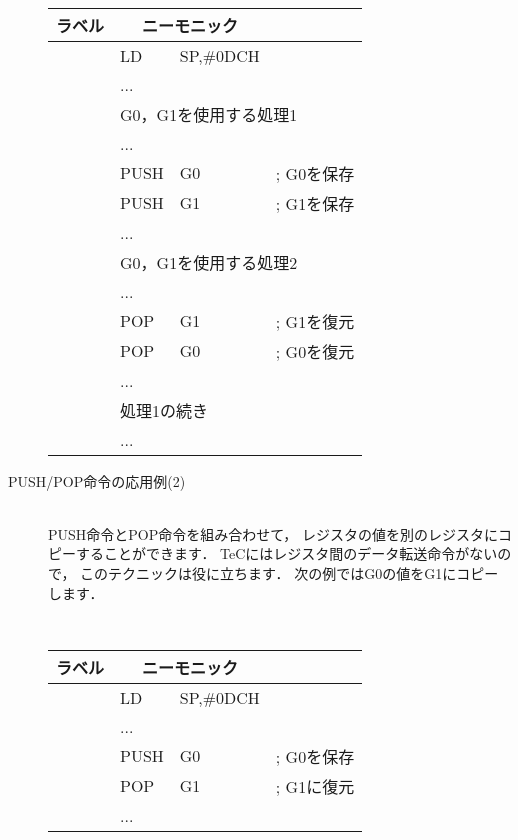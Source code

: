\begin{description}
\begin{center}
{\small\tt
\begin{tabular}{|l|l l l|}
\hline
ラベル & \multicolumn{2}{|c}{ニーモニック} & \\
\hline
    & LD   & SP,\#0DCH&            \\
    & ...  &          &            \\
    & \multicolumn{3}{|l|}{G0，G1を使用する処理1} \\
    & ...  &          &            \\
    & PUSH & G0       & ; G0を保存 \\
    & PUSH & G1       & ; G1を保存 \\
    & ...  &        & \\
    & \multicolumn{3}{|l|}{G0，G1を使用する処理2} \\
    & ...  &          &            \\
    & POP  & G1       & ; G1を復元 \\
    & POP  & G0       & ; G0を復元 \\
    & ...  &        & \\
    & \multicolumn{3}{|l|}{処理1の続き} \\
    & ...  &          &            \\
\hline
\end{tabular}
}
\end{center}

\item[PUSH/POP命令の応用例(2)]　\\
PUSH命令とPOP命令を組み合わせて，
レジスタの値を別のレジスタにコピーすることができます．
TeCにはレジスタ間のデータ転送命令がないので，
このテクニックは役に立ちます．
次の例ではG0の値をG1にコピーします．

\begin{center}
{\small\tt
\begin{tabular}{|l|l l l|}
\hline
ラベル & \multicolumn{2}{|c}{ニーモニック} & \\
\hline
    & LD   & SP,\#0DCH&            \\
    & ...  &          &            \\
    & PUSH & G0       & ; G0を保存 \\
    & POP  & G1       & ; G1に復元 \\
    & ...  &        & \\
\hline
\end{tabular}
}
\end{center}

\end{description}

